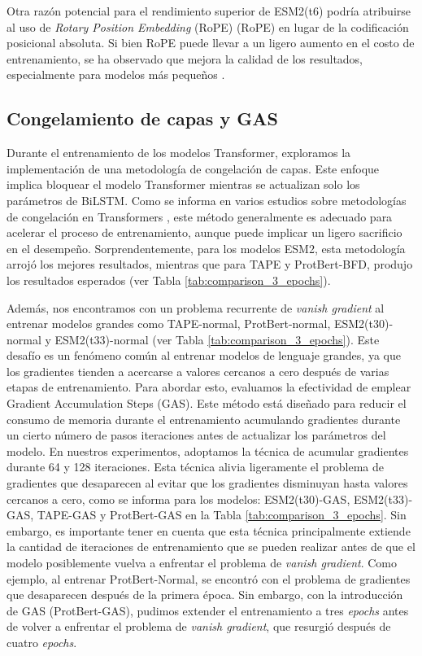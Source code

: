 Otra razón potencial para el rendimiento superior de ESM2(t6) podría atribuirse al uso de \textit{Rotary Position Embedding} (RoPE) (RoPE) en lugar de la codificación posicional absoluta. Si bien RoPE puede llevar a un ligero aumento en el costo de entrenamiento, se ha observado que mejora la calidad de los resultados, especialmente para modelos más pequeños \citep{lin2023evolutionary}.

\subsection{Congelamiento de capas y GAS}
Durante el entrenamiento de los modelos Transformer, exploramos la implementación de una metodología de congelación de capas. Este enfoque implica bloquear el modelo Transformer mientras se actualizan solo los parámetros de BiLSTM. Como se informa en varios estudios sobre metodologías de congelación en Transformers \citep{merchant2020happens,lee2019would,kovaleva2019revealing}, este método generalmente es adecuado para acelerar el proceso de entrenamiento, aunque puede implicar un ligero sacrificio en el desempeño. Sorprendentemente, para los modelos ESM2, esta metodología arrojó los mejores resultados, mientras que para TAPE y ProtBert-BFD, produjo los resultados esperados (ver Tabla \ref{tab:comparison_3_epochs}).


Además, nos encontramos con un problema recurrente de \textit{vanish gradient} al entrenar modelos grandes como TAPE-normal, ProtBert-normal, ESM2(t30)-normal y ESM2(t33)-normal (ver Tabla \ref{tab:comparison_3_epochs}). Este desafío es un fenómeno común al entrenar modelos de lenguaje grandes, ya que los gradientes tienden a acercarse a valores cercanos a cero después de varias etapas de entrenamiento. Para abordar esto, evaluamos la efectividad de emplear Gradient Accumulation Steps (GAS). Este método está diseñado para reducir el consumo de memoria durante el entrenamiento acumulando gradientes durante un cierto número de pasos iteraciones antes de actualizar los parámetros del modelo. En nuestros experimentos, adoptamos la técnica de acumular gradientes durante 64 y 128 iteraciones. Esta técnica alivia ligeramente el problema de gradientes que desaparecen al evitar que los gradientes disminuyan hasta valores cercanos a cero, como se informa para los modelos: ESM2(t30)-GAS, ESM2(t33)-GAS, TAPE-GAS y ProtBert-GAS en la Tabla \ref{tab:comparison_3_epochs}. Sin embargo, es importante tener en cuenta que esta técnica principalmente extiende la cantidad de iteraciones de entrenamiento que se pueden realizar antes de que el modelo posiblemente vuelva a enfrentar el problema de \textit{vanish gradient}. Como ejemplo, al entrenar ProtBert-Normal, se encontró con el problema de gradientes que desaparecen después de la primera época. Sin embargo, con la introducción de GAS (ProtBert-GAS), pudimos extender el entrenamiento a tres \textit{epochs} antes de volver a enfrentar el problema de \textit{vanish gradient}, que resurgió después de cuatro \textit{epochs}.


